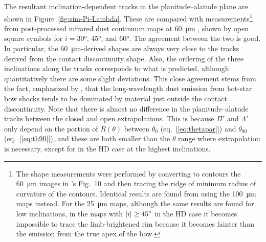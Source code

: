The resultant inclination-dependent tracks in the planitude--alatude
plane are shown in Figure~\ref{fig:sim-Pi-Lambda}.  These are compared
with measurements\footnote{%
  The shape measurements were performed by converting to contours the
  \SI{60}{\um} images in \citet{Meyer:2017a}'s Fig.~10 and then
  tracing the ridge of minimum radius of curvature of the contours.
  Identical results are found from using the \SI{100}{\um} maps
  instead.  For the \SI{25}{\um} maps, although the same results are
  found for low inclinations, in the maps with
  \(\lvert i\rvert \ge \ang{45}\) in the HD case it becomes impossible to trace
  the limb-brightened rim because it becomes fainter than the emission
  from the true apex of the bow.} %
from post-processed infrared dust continuum maps at \SI{60}{\um}
\citep[\S~4.3 of][]{Meyer:2017a}, shown by open square symbols for
\(i = \ang{30}\), \ang{45}, and \ang{60}.  The agreement between the
two is good.  In particular, the \SI{60}{\um}-derived shapes are
always very close to the tracks derived from the contact discontinuity
shape. Also, the ordering of the three inclinations along the tracks
corresponds to what is predicted, although quantitatively there are
some slight deviations.  This close agreement stems from the fact,
emphasized by \citet{Meyer:2014b}, that the long-wavelength dust
emission from hot-star bow shocks tends to be dominated by material
just outside the contact discontinuity.  Note that there is almost no
difference in the planitude--alatude tracks between the closed and open
extrapolations.  This is because \(\Pi'\) and \(\Lambda'\) only depend on the
portion of \(R(\theta)\) between \(\theta_0\) (eq.~[\ref{eq:thetapar}]) and
\(\theta_{90}\) (eq.~[\ref{eq:th90}]), and these are both smaller than the
\(\theta\) range where extrapolation is necessary, except for in the HD
case at the highest inclinations.

